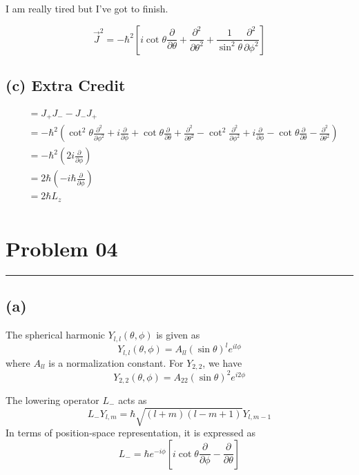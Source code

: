 \documentclass[letter, 10pts]{article}
\newcommand{\hb}{\hbar}
\begin{document}
I am really tired but I've got to finish. 


\[ \vec{J}^2 = 
\boxed{
- \hb ^2
\left[
 i \cot \theta \frac{\partial}{\partial \theta}
+ 
\frac{\partial ^2 }{\partial \theta ^2}
+ 
\frac{1}{\sin ^2 \theta}
\frac{\partial^2}{\partial \phi^2}
\right]  
}
\] 





\subsection*{(c) Extra Credit} 
\begin{align*}
	[J_+, J_-]
	&= 
J_+ J_-  - J_- J_+ 
	\\ 
	&= 
- \hb^2 
\left(
\cot ^2 \theta \frac{\partial ^2 }{\partial \phi ^2 } 
+ i 
\frac{\partial }{\partial \phi }
+ 
\cot \theta 
\frac{\partial }{\partial \theta} 
+ \frac{\partial ^2 }{\partial \theta ^2 } 
- \cot ^2 \frac{\partial ^2}{\partial \phi ^2}
+ i \frac{\partial }{\partial \phi} 
- \cot \theta \frac{\partial }{\partial \theta} 
- \frac{\partial ^2}{\partial \theta ^2}
\right)
	\\
	&= 
-\hb ^2 
\left( 
	2 i \frac{\partial}{\partial \phi }
\right)
	\\
	&= 
2 \hb  
\left( 
	 - i \hb \frac{\partial}{\partial \phi }
\right)
	\\ 
	&= 2 \hb L_z \\
\end{align*}




\newpage
\section*{Problem 04} 
\hrule 

\subsection*{(a)}

The spherical harmonic \( Y_{l,l}(\theta, \phi) \) is given as
\[
Y_{l,l}(\theta, \phi) = A_{ll} (\sin\theta)^l e^{il\phi}
\]
where \( A_{ll} \) is a normalization constant. For \( Y_{2,2} \), we have
\[
Y_{2,2}(\theta, \phi) = A_{22} (\sin\theta)^2 e^{i2\phi}
\]




The lowering operator \( L_- \) acts as
\[
L_- Y_{l,m} = \hbar \sqrt{(l+m)(l-m+1)} Y_{l,m-1}
\]
In terms of position-space representation, it is expressed as
\[
L_- = \hbar e^{-i\phi} \left[i\cot\theta \frac{\partial}{\partial\phi} - \frac{\partial}{\partial\theta} \right]
\]
\end{document}
